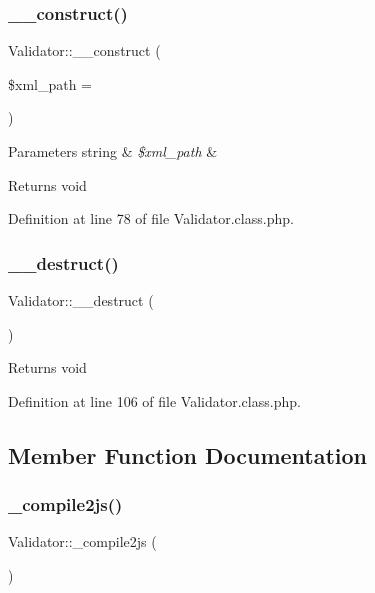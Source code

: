 \subsubsection{\texorpdfstring{\+\_\+\+\_\+construct()}{\_\_construct()}}
{\footnotesize\ttfamily Validator\+::\+\_\+\+\_\+construct (\begin{DoxyParamCaption}\item[{}]{\$xml\+\_\+path = {\ttfamily \textquotesingle{}\textquotesingle{}} }\end{DoxyParamCaption})}


\begin{DoxyParams}[1]{Parameters}
string & {\em \$xml\+\_\+path} & \\
\hline
\end{DoxyParams}
\begin{DoxyReturn}{Returns}
void 
\end{DoxyReturn}


Definition at line 78 of file Validator.\+class.\+php.

\mbox{\label{classValidator_aa076d09e847e8461281d4912688a9388}} 
\subsubsection{\texorpdfstring{\+\_\+\+\_\+destruct()}{\_\_destruct()}}
{\footnotesize\ttfamily Validator\+::\+\_\+\+\_\+destruct (\begin{DoxyParamCaption}{ }\end{DoxyParamCaption})}

\begin{DoxyReturn}{Returns}
void 
\end{DoxyReturn}


Definition at line 106 of file Validator.\+class.\+php.



\subsection{Member Function Documentation}
\mbox{\label{classValidator_ae7b44a7a2bfb3ee4672b4cf2cdbd059f}} 
\subsubsection{\texorpdfstring{\+\_\+compile2js()}{\_compile2js()}}
{\footnotesize\ttfamily Validator\+::\+\_\+compile2js (\begin{DoxyParamCaption}{ }\end{DoxyParamCaption})}

